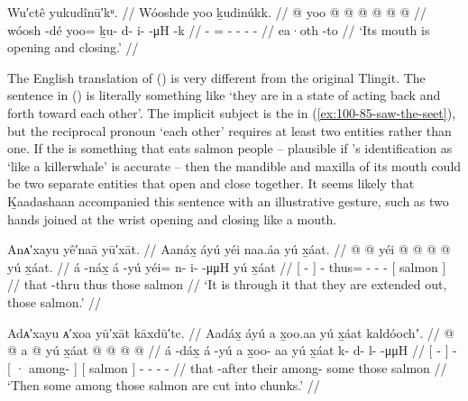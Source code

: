 \xe


\ex\label{ex:100-86-act-to-fro}%
%
\begingl
	\glpreamble	Wu′ctê yukudînū′kᵘ. //
	\glpreamble	Wóoshde yoo ḵudinúkk. //
	\gla	{}  @ {} {} 
		yoo @  @ {} @ {} @ {} @ {} @ {} //
	\glb	{} wóosh -dé {}
		yoo= ḵu- d- i-  -μH -k //
	\glc	{}  - {}
		= - - -  - //
	\gld	{} ea·oth -to {}
		  {} {} {} {} {} //
	\glft	‘Its mouth is opening and closing.’
		//
\endgl
\xe

The English translation of (\lastx) is very different from the original Tlingit.
The sentence in (\lastx) is literally something like ‘they are in a state of acting back and forth toward each other’.
The implicit subject is the  in (\ref{ex:100-85-saw-the-seet}), but the reciprocal pronoun  ‘each other’ requires at least two entities rather than one.
If the  is something that eats salmon people – plausible if \citeauthor{leer:1978b}’s identification as ‘like a killerwhale’ is accurate – then the mandible and maxilla of its mouth could be two separate entities that open and close together.
It seems likely that Ḵaadashaan accompanied this sentence with an illustrative gesture, such as two hands joined at the wrist opening and closing like a mouth.

\ex\label{ex:100-87-extend-through}%
%
\begingl
	\glpreamble	Anᴀ′xayu yê′naā yū′xāt. //
	\glpreamble	Aanáx̱ áyú yéi naa.áa yú x̱áat. //
	\gla	{}  @ {} {}
		 @ {}
		yéi @  @ {} @ {} @ {}
		{} yú x̱áat. {} //
	\glb	{} á -náx̱ {}
		á -yú
		yéi= n- i-  -μμH
		{} yú x̱áat {} //
	\glc	{}[  - {}]  -
		thus= - -  -
		{}[  salmon {}] //
	\gld	{} that -thru {}  {}
		thus  {} {} {} 
		{} those salmon {} //
	\glft	‘It is through it that they are extended out, those salmon.’
		//
\endgl
\xe

\ex\label{ex:100-88-chunked}%
%
\begingl
	\glpreamble	Adᴀ′xayu ᴀ′xoa yū′xāt kāxdū′tc. //
	\glpreamble	Aadáx̱ áyú a x̱oo.aa yú x̱áat kaldóochʼ. //
	\gla	{}  @ {} {}  @ {} 
		{} a  @ {} {} 
		{} yú x̱áat {}
		 @ {} @ {} @ {} @ {} //
	\glb	{} á -dáx̱ {} á -yú
		{} a x̱oo- aa {} 
		{} yú x̱áat {} 
		k- d- l-  -μμH //
	\glc	{}[  - {}]  - 
		{}[ · among-  {}]
		{}[  salmon {}]
		- - -  - //
	\gld	{} that -after {}  {}
		{} their among- some {} 
		{} those salmon {}
		 {} {} {} {} //
	\glft	‘Then some among those salmon are cut into chunks.’
		//
\endgl
\xe

